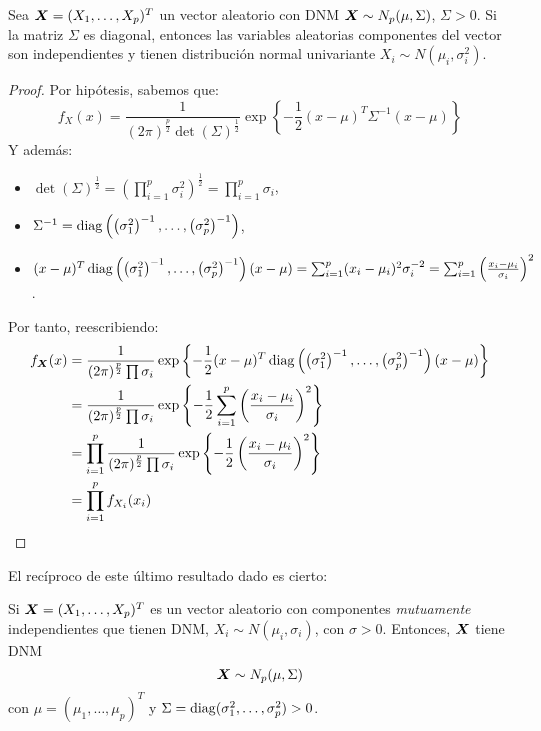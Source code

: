   \begin{nprop}
    Sea $\boldsymbol{X} = (X_1,\dots,X_p)^T$ un vector aleatorio con DNM $\boldsymbol{X} \sim N_p(\mu,\Sigma)$, $\Sigma > 0$. Si la matriz $\Sigma$ es diagonal,
    entonces las variables aleatorias componentes del vector son independientes y tienen distribución normal univariante $X_i \sim N\left(\mu_i, \sigma_i^2\right)$.
  \end{nprop}
  \begin{proof}
    Por hipótesis, sabemos que:
    \[
    f_X(x) = \frac{1}{(2\pi)^{\frac{p}{2}} \det(\Sigma)^{\frac{1}{2}}}\exp\left\{- \frac{1}{2}(x-\mu)^T \Sigma^{-1}(x-\mu)\right\}
    \]
    Y además:
    \begin{itemize}
    \item $\det(\Sigma)^{\frac{1}{2}} = \left(\prod_{i = 1}^p \sigma_i^2\right)^{\frac{1}{2}} = \prod_{i=1}^p \sigma_i$,
    \item $\Sigma^{-1} = \operatorname{diag}\left(\left(\sigma_1^2\right)^{-1}, \dots , \left(\sigma_p^2\right)^{-1}\right)$,
      \item $(x-\mu)^T \operatorname{diag}\left(\left(\sigma_1^2\right)^{-1}, \dots , \left(\sigma_p^2\right)^{-1}\right) (x-\mu) = \sum_{i=1}^p (x_i-\mu_i)^2 \sigma_i^{-2} = \sum_{i = 1}^p \left(\frac{x_i-\mu_i}{\sigma_i}\right)^2$.
    \end{itemize}
    Por tanto, reescribiendo:
    \[
      \begin{split}
        f_{\boldsymbol{X}}(x) & = \frac{1}{(2\pi)^{\frac{p}{2}} \prod \sigma_i} \exp \left\{ -\frac{1}{2}(x-\mu)^T \operatorname{diag}\left(\left(\sigma_1^2\right)^{-1}, \dots , \left(\sigma_p^2\right)^{-1}\right) (x-\mu)  \right\} \\
        & = \frac{1}{(2\pi)^{\frac{p}{2}} \prod \sigma_i} \exp \left\{ -\frac{1}{2} \sum_{i = 1}^p \left(\frac{x_i-\mu_i}{\sigma_i}\right)^2  \right\} \\
        & = \prod_{i = 1}^p  \frac{1}{(2\pi)^{\frac{p}{2}} \prod \sigma_i} \exp \left\{ -\frac{1}{2} \left(\frac{x_i-\mu_i}{\sigma_i}\right)^2  \right\} \\
        & = \prod_{i = 1}^p f_{X_i}(x_i)
    \end{split}
    \]

  \end{proof}


  El recíproco de este último resultado dado es cierto:
  \begin{nprop}
    Si $\boldsymbol{X} = (X_1,\dots,X_p)^T$ es un vector aleatorio con componentes \emph{mutuamente} independientes que tienen DNM, $X_i \sim N(\mu_i, \sigma_i)$, con $\sigma > 0$. Entonces, $\boldsymbol{X}$ tiene DNM
    \[
    \boldsymbol{X} \sim N_p(\mu, \Sigma)
    \]
    con $\mu = (\mu_1,\dots,\mu_p)^T$ y $\Sigma = \operatorname{diag}(\sigma_1^2 , \dots , \sigma_p^2) > 0$.
  \end{nprop}

